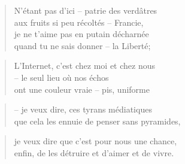   \begin{verse}
    N’étant pas d’ici -- patrie des verdâtres\\
    aux fruits si peu récoltés -- Francie,\\
    je ne t’aime pas en putain décharnée\\
    quand tu ne sais donner -- la Liberté;
  \end{verse}
  \begin{verse}
    L’Internet, c’est chez moi et chez nous\\
    -- le seul lieu où nos échos\\
    ont une couleur vraie -- pis, uniforme
  \end{verse}
  \begin{verse}
    -- je veux dire, ces tyrans médiatiques\\
    que cela les ennuie de penser sans pyramides,
  \end{verse}
  \begin{verse}
    je veux dire que c’est pour nous une chance,\\
    enfin, de les détruire et d’aimer et de vivre.
  \end{verse}
